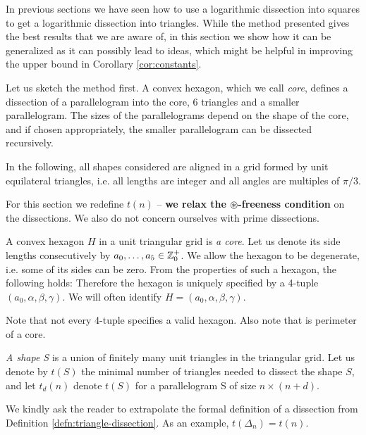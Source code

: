 In previous sections we have seen how to use a logarithmic dissection into squares to get a logarithmic dissection into triangles. While the method presented gives the best results that we are aware of, in this section we show how it can be generalized as it can possibly lead to ideas, which might be helpful in improving the upper bound in Corollary \ref{cor:constants}.

Let us sketch the method first. A convex hexagon, which we call \emph{core}, defines a dissection of a parallelogram into the core, 6 triangles and a smaller parallelogram. The sizes of the parallelograms depend on the shape of the core, and if chosen appropriately, the smaller parallelogram can be dissected recursively.

In the following, all shapes considered are aligned in a grid formed by unit equilateral triangles, i.e. all lengths are integer and all angles are multiples of $\pi/3$.

For this section we redefine $t(n)$ -- \textbf{we relax the $\circledast$-freeness condition} on the dissections. We also do not concern ourselves with prime dissections.

\begin{defn}
A convex hexagon $H$ in a unit triangular grid is \emph{a core}. Let us denote its side lengths consecutively by $a_0,\dots,a_5 \in \mathbb Z_0^+$. We allow the hexagon to be degenerate, i.e. some of its sides can be zero. From the properties of such a hexagon, the following holds:
Therefore the hexagon is uniquely specified by a 4-tuple $(a_0, \alpha, \beta, \gamma)$. We will often identify $H = (a_0, \alpha, \beta, \gamma)$.
\end{defn}

Note that not every 4-tuple specifies a valid hexagon. Also note that
%
is perimeter of a core.

\begin{defn}
\emph{A shape S} is a union of finitely many unit triangles in the triangular grid. Let us denote by $t(S)$ the minimal number of triangles needed to dissect the shape $S$, and let $t_d(n)$ denote $t(S)$ for a parallelogram S of size $n \times (n+d)$.
\end{defn}

We kindly ask the reader to extrapolate the formal definition of a dissection from Definition \ref{defn:triangle-dissection}. As an example, $t(\Delta_n) = t(n)$.

